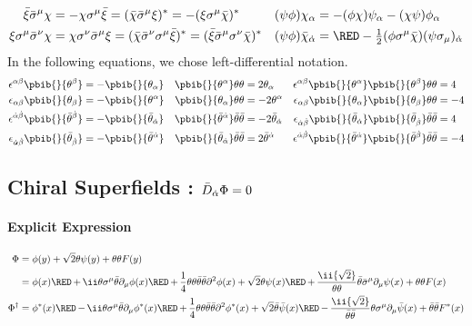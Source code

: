 \vspace{-2.5zw}
\begin{align*}
 \bar\xi\bSm\chi&=-\chi\Sm\bar\xi=(\bar\chi\bSm\xi)^*=-(\xi\Sm\bar\chi)^*&
 (\psi\phi)\chi_\alpha&=-(\phi\chi)\psi_\alpha-(\chi\psi)\phi_\alpha
\\
 \xi\Sm\bSn\chi&=\chi\Sn\bSm\xi=(\bar\chi\bSn\Sm\bar\xi)^*=(\bar\xi\bSm\Sn\bar\chi)^*&
 (\psi\phi)\bar\chi_\dalpha&={\RED-\tfrac12}(\phi\Sm\bar\chi)(\psi\Smd)_\dalpha
\end{align*}
In the following equations, we chose left-differential notation.
\begin{align*}
 \epsilon^{\alpha\beta}\pbib{}{\theta^\beta}&=-\pbib{}{\theta_\alpha}&
 \pbib{}{\theta^\alpha}\thth&=2\theta_\alpha&
 \epsilon^{\alpha\beta}\pbib{}{\theta^\alpha}\pbib{}{\theta^\beta}\thth &= 4\\
 \epsilon_{\alpha\beta}\pbib{}{\theta_\beta}&=-\pbib{}{\theta^\alpha}&
 \pbib{}{\theta_\alpha}\thth&=-2\theta^\alpha&
 \epsilon_{\alpha\beta}\pbib{}{\theta_\alpha}\pbib{}{\theta_\beta}\thth &= -4\\
 \epsilon^{\dalpha\dbeta}\pbib{}{\btheta^\dbeta}&=-\pbib{}{\btheta_\dalpha}&
 \pbib{}{\btheta^\dalpha}\bthth&=-2\btheta_\dalpha&
 \epsilon_{\dalpha\dbeta}\pbib{}{\btheta_\dalpha}\pbib{}{\btheta_\dbeta}\bthth &= 4\\
 \epsilon_{\dalpha\dbeta}\pbib{}{\btheta_\dbeta}&=-\pbib{}{\btheta^\dalpha}&
 \pbib{}{\btheta_\dalpha}\bthth&=2\btheta^\dalpha&
 \epsilon^{\dalpha\dbeta}\pbib{}{\btheta^\dalpha}\pbib{}{\btheta^\dbeta}\bthth &= -4
\end{align*}


\newpage
\subsection{Chiral Superfields : $\bar D_{\dot\alpha} \Phi = 0$}
\paragraph{Explicit Expression}
\begin{align}
\Phi
={}& \phi(y) + \sqrt2\theta\psi(y)+\thth F(y)\\
={}& \phi(x){\RED\,+\,} \ii\theta\Sm\btheta\Pm\phi(x)
               {\RED\,+\,} \frac14\thth\bthth\Psq\phi(x)
     + \sqrt2\theta\psi(x){\RED\,+\,}\frac\ii{\sqrt2}\thth\btheta\bSm\Pm\psi(x)
     + \thth F(x)\\
\Phi^\dagger
={}& \phi^*(x){\RED\,-\,} \ii\theta\Sm\btheta\Pm\phi^*(x)
              {\RED\,+\,} \frac14\thth\bthth\Psq\phi^*(x)
   + \sqrt2\btheta\bar\psi(x){\RED\,-\,} \frac\ii{\sqrt2}\bthth\theta\Sm\Pm\bar\psi(x)
   + \bthth F^*(x)
\end{align}

